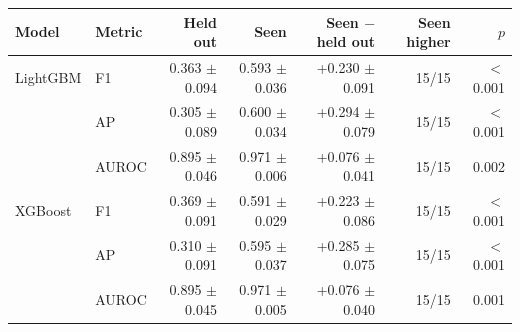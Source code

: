 \begin{tabular}{llrrrrr}
\toprule
Model & Metric & Held out & Seen & Seen $-$ held out & Seen higher & $p$ \\
\midrule
LightGBM & F1 & 0.363 $\pm$ 0.094 & 0.593 $\pm$ 0.036 & +0.230 $\pm$ 0.091 & 15/15 & $<$0.001 \\
 & AP & 0.305 $\pm$ 0.089 & 0.600 $\pm$ 0.034 & +0.294 $\pm$ 0.079 & 15/15 & $<$0.001 \\
 & AUROC & 0.895 $\pm$ 0.046 & 0.971 $\pm$ 0.006 & +0.076 $\pm$ 0.041 & 15/15 & 0.002 \\
\midrule
XGBoost & F1 & 0.369 $\pm$ 0.091 & 0.591 $\pm$ 0.029 & +0.223 $\pm$ 0.086 & 15/15 & $<$0.001 \\
 & AP & 0.310 $\pm$ 0.091 & 0.595 $\pm$ 0.037 & +0.285 $\pm$ 0.075 & 15/15 & $<$0.001 \\
 & AUROC & 0.895 $\pm$ 0.045 & 0.971 $\pm$ 0.005 & +0.076 $\pm$ 0.040 & 15/15 & 0.001 \\
\bottomrule
\end{tabular}
